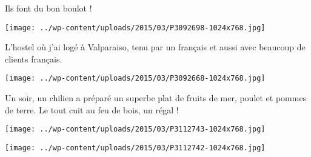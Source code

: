 Ils font du bon boulot !
\begin{center} \texttt{[image: ../wp-content/uploads/2015/03/P3092698-1024x768.jpg]} \end{center}

\pagebreak
 L'hostel où j'ai logé à Valparaiso, tenu par un français et aussi avec beaucoup de clients français.
\begin{center} \texttt{[image: ../wp-content/uploads/2015/03/P3092668-1024x768.jpg]} \end{center}

 Un soir, un chilien a préparé un superbe plat de fruits de mer, poulet et pommes de terre. Le tout cuit au feu de bois, un régal !
\begin{center} \texttt{[image: ../wp-content/uploads/2015/03/P3112743-1024x768.jpg]} \end{center}
\begin{center} \texttt{[image: ../wp-content/uploads/2015/03/P3112742-1024x768.jpg]} \end{center}

